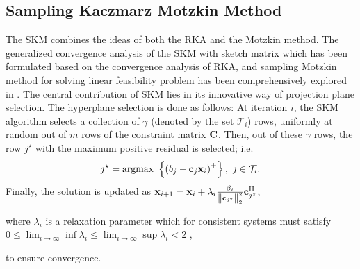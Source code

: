 \documentclass[12pt,draftcls,onecolumn]{IEEEtran}
\begin{document}
\subsection{Sampling Kaczmarz Motzkin Method}
\label{sec_SKM}
The SKM combines the ideas of both the RKA and the Motzkin method. The generalized convergence analysis of the SKM with sketch matrix which has been formulated based on the convergence analysis of RKA, and sampling Motzkin method for solving linear feasibility problem has been comprehensively explored in \cite{de2017sampling}.
The central contribution of SKM lies in its innovative way of projection plane selection. The hyperplane selection is done as follows: At iteration $i$, the SKM algorithm selects a collection of $\gamma$ (denoted by the set $\mathcal{T}_{i}$) rows, uniformly at random out of $m$ rows of the constraint matrix $\mathbf{C}$. Then, out of these $\gamma$ rows, the row $j^{\star}$ with the maximum positive residual is selected; i.e.
\begin{equation}
j^{\star}=\operatorname{argmax}~\left\{ \left(b_{j}-\mathbf{c}_{j}\mathbf{x}_{i}\right)^{+}\right\},~j\in\mathcal{T}_{i}.    
\end{equation} 
Finally, the solution is updated as \cite{de2017sampling,sarowar2020sampling} $\mathbf{x}_{i+1}=\mathbf{x}_{i}+\lambda_{i}\frac{\beta_{i}}{\left\|\mathbf{c}_{j^\star}\right\|^{2}_{2}} \mathbf{c}^{\mathrm{H}}_{j^{\star}}$,

where $\lambda_{i}$ is a relaxation parameter which for consistent systems must satisfy $0\leq \lim_{i\to\infty} \inf \lambda_{i}\leq \lim_{i\to\infty} \sup \lambda_{i}<2$ \cite{strohmer2009randomized},

to ensure convergence. %
\end{document}
